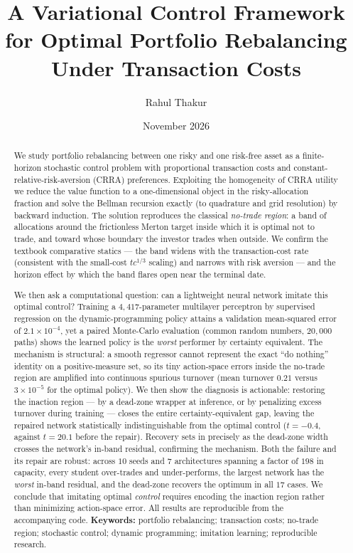 \documentclass[11pt]{article}
\title{\bfseries A Variational Control Framework for Optimal Portfolio
Rebalancing Under Transaction Costs}
\author[1]{Rahul Thakur}
\affil[1]{\normalsize \affiliation}
\affil[ ]{\normalsize\texttt{raahul.thakurr01@gmail.com}}
\date{November 2026}
\begin{document}
\maketitle

\begin{abstract}
\noindent
We study portfolio rebalancing between one risky and one risk-free asset as a
finite-horizon stochastic control problem with proportional transaction costs
and constant-relative-risk-aversion (CRRA) preferences. Exploiting the
homogeneity of CRRA utility we reduce the value function to a one-dimensional
object in the risky-allocation fraction and solve the Bellman recursion exactly
(to quadrature and grid resolution) by backward induction. The solution
reproduces the classical \emph{no-trade region}: a band of allocations around
the frictionless Merton target inside which it is optimal not to trade, and
toward whose boundary the investor trades when outside. We confirm the textbook
comparative statics --- the band widens with the transaction-cost rate
(consistent with the small-cost $tc^{1/3}$ scaling) and narrows with risk
aversion --- and the horizon effect by which the band flares open near the
terminal date.

We then ask a computational question: can a lightweight neural network imitate
this optimal control? Training a $4{,}417$-parameter multilayer perceptron by
supervised regression on the dynamic-programming policy attains a validation
mean-squared error of $2.1\times10^{-4}$, yet a paired Monte-Carlo evaluation
(common random numbers, $20{,}000$ paths) shows the learned policy is the
\emph{worst} performer by certainty equivalent. The mechanism is structural: a
smooth regressor cannot represent the exact ``do nothing'' identity on a
positive-measure set, so its tiny action-space errors inside the no-trade region
are amplified into continuous spurious turnover (mean turnover $0.21$ versus
$3\times10^{-5}$ for the optimal policy). We then show the diagnosis is
actionable: restoring the inaction region --- by a dead-zone wrapper at
inference, or by penalizing excess turnover during training --- closes the
entire certainty-equivalent gap, leaving the repaired network statistically
indistinguishable from the optimal control ($t=-0.4$, against $t=20.1$ before
the repair). Recovery sets in precisely as the dead-zone width crosses the
network's in-band residual, confirming the mechanism. Both the failure and its
repair are robust: across $10$ seeds and $7$ architectures spanning a factor of
$198$ in capacity, every student over-trades and under-performs, the largest
network has the \emph{worst} in-band residual, and the dead-zone recovers the
optimum in all $17$ cases. We conclude that imitating optimal \emph{control}
requires encoding the inaction region rather than minimizing action-space error.
All results are reproducible from the accompanying code.
\vspace{0.6em}
\noindent\textbf{Keywords:} portfolio rebalancing; transaction costs; no-trade
region; stochastic control; dynamic programming; imitation learning;
reproducible research.


\end{abstract}
\end{document}
